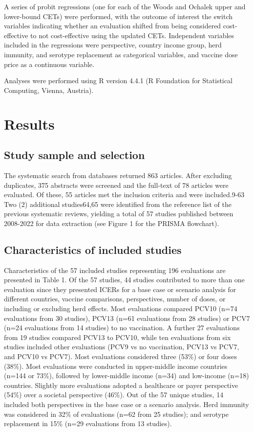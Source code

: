 \documentclass[12pt]{article}
\begin{document}
A series of probit regressions (one for each of the Woods and Ochalek upper and lower-bound CETs) were performed, with the outcome of interest the switch variables indicating whether an evaluation shifted from being considered cost-effective to not cost-effective using the updated CETs. Independent variables included in the regressions were perspective, country income group, herd immunity, and serotype replacement as categorical variables, and vaccine dose price as a continuous variable.

Analyses were performed using R version 4.4.1 (R Foundation for Statistical Computing, Vienna, Austria). 


\section{Results}
\subsection{Study sample and selection}
The systematic search from databases returned 863 articles. After excluding duplicates, 375 abstracts were screened and the full-text of 78 articles were evaluated. Of these, 55 articles met the inclusion criteria and were included.9-63 Two (2) additional studies64,65 were identified from the reference list of the previous systematic reviews, yielding a total of 57 studies published between 2008-2022 for data extraction (see  Figure 1 for the PRISMA flowchart). 

\subsection{Characteristics of included studies}
Characteristics of the 57 included studies representing 196 evaluations are presented in Table 1. Of the 57 studies, 44 studies contributed to more than one evaluation  since they presented ICERs for a base case or scenario analysis for different countries, vaccine comparisons, perspectives, number of doses, or including or excluding herd effects. Most evaluations compared PCV10 (n=74 evaluations from 30 studies), PCV13 (n=61 evaluations from 28 studies) or PCV7 (n=24 evaluations from 14 studies) to no vaccination. A further 27 evaluations from 19 studies compared PCV13 to PCV10, while ten evaluations from six studies included other evaluations (PCV9 vs no vaccination, PCV13 vs PCV7, and PCV10 vs PCV7). Most evaluations considered three (53\%) or four doses (38\%). Most evaluations were conducted in upper-middle income countries (n=144 or 73\%), followed by lower-middle income (n=34) and low-income (n=18) countries. Slightly more evaluations adopted a healthcare or payer perspective (54\%) over a societal perspective (46\%). Out of the 57 unique studies, 14 included both perspectives in the base case or a scenario analysis. Herd immunity was considered in 32\% of evaluations (n=62 from 25 studies); and serotype replacement in 15\% (n=29 evaluations from 13 studies). 
\end{document}
